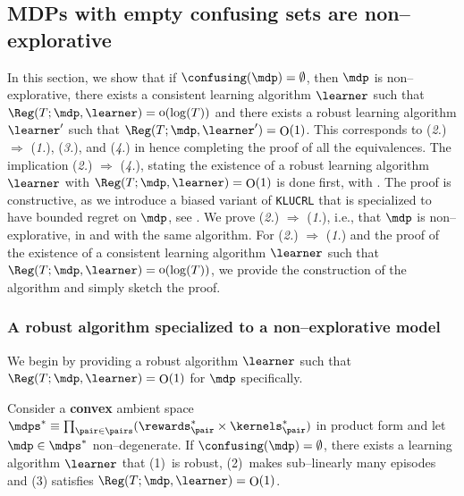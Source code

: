 \documentclass[preprint,cleveref,12pt]{colt2025}
\def\product{\prod}
\DeclareMathOperator*{\oh}{\mathrm{o}}
\DeclareMathOperator*{\OH}{\mathrm{O}}
\def\model{\mdp}
\def\models{\mdps}
\newcommand{\strong}[1]{\textbf{#1}}
\begin{document}
    \subsection{MDPs with empty confusing sets are non--explorative}
    \label{appendix_empty_confusing_implies_non_explorative}

    In this section, we show that if $\confusing(\model) = \emptyset$, then $\model$ is non--explorative, there exists a consistent learning algorithm $\learner$ such that $\Reg(T; \model, \learner) = \oh(\log(T))$ and there exists a robust learning algorithm $\learner'$ such that $\Reg(T; \model, \learner') = \OH(1)$.
    This corresponds to (\textit{2.}) $\Rightarrow$ (\textit{1.}), (\textit{3.}), and (\textit{4.}) in  hence completing the proof of all the equivalences. 
    The implication (\textit{2.}) $\Rightarrow$ (\textit{4.}), stating the existence of a robust learning algorithm $\learner$ with $\Reg(T; \model, \learner) = \OH(1)$ is done first, with . 
    The proof is constructive, as we introduce a biased variant of \texttt{KLUCRL} \cite{filippi_optimism_2010} that is specialized to have bounded regret on $\model$, see . 
    We prove (\textit{2.}) $\Rightarrow$ (\textit{1.}), i.e., that $\model$ is non--explorative, in  and with the same algorithm. 
    For (\textit{2.}) $\Rightarrow$ (\textit{1.}) and the proof of the existence of a consistent learning algorithm $\learner$ such that $\Reg(T; \model, \learner) = \oh(\log(T))$, we provide the construction of the algorithm and simply sketch the proof.

    \subsubsection{A robust algorithm specialized to a non--explorative model}
    \label{appendix_confusing_empty_robust}

    We begin by providing a robust algorithm $\learner$ such that $\Reg(T; \model, \learner) = \OH(1)$ for $\model$ specifically. 

    \begin{proposition}
    \label{proposition_confusing_empty_robust}
        Consider a \strong{convex} ambient space $\models^* \equiv \product_{\pair \in \pairs} (\rewards^*_\pair \times \kernels^*_\pair)$ in product form and let $\model \in \models^*$ non--degenerate.
        If $\confusing(\model) = \emptyset$, there exists a learning algorithm $\learner$ that 
        (1)~is robust,
        (2)~makes sub--linearly many episodes and
        (3) satisfies $\Reg(T; \model, \learner) = \OH(1)$.
    \end{proposition}
\end{document}
